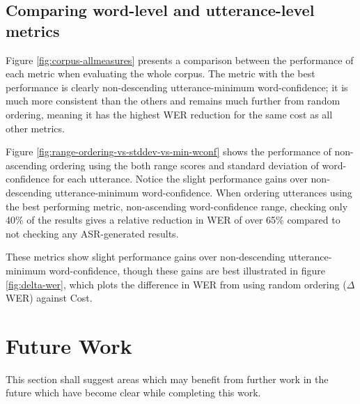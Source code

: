 \subsection{Comparing word-level and utterance-level metrics}

Figure \ref{fig:corpus-allmeasures} presents a comparison between the performance of each metric when evaluating the whole corpus.
The metric with the best performance is clearly non-descending utterance-minimum word-confidence; it is much more consistent than the others and remains much further from random ordering, meaning it has the highest WER reduction for the same cost as all other metrics.

Figure \ref{fig:range-ordering-vs-stddev-vs-min-wconf} shows the performance of non-ascending ordering using the both range scores and standard deviation of word-confidence for each utterance. 
Notice the slight performance gains over non-descending utterance-minimum word-confidence.
When ordering utterances using the best performing metric, non-ascending word-confidence range, checking only 40\% of the results gives a relative reduction in WER of over 65\% compared to not checking any ASR-generated results.



These metrics show slight performance gains over non-descending utterance-minimum word-confidence, though these gains are best illustrated in figure \ref{fig:delta-wer}, which plots the difference in WER from using random ordering ($\Delta$WER) against Cost.



\section{Future Work}

This section shall suggest areas which may benefit from further work in the future which have become clear while completing this work.
